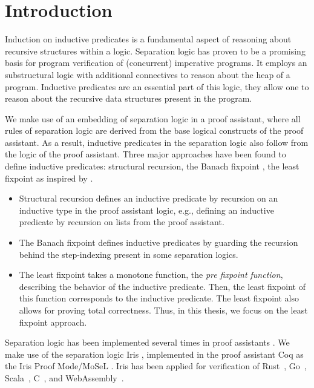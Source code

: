 \documentclass[thesis.tex]{subfiles}
\begin{document}
\chapter{Introduction}\label{ch:introduction}

Induction on inductive predicates is a fundamental aspect of reasoning about recursive structures within a logic. Separation logic \cite{ohearnLocalReasoningPrograms2001,reynoldsSeparationLogicLogic2002b} has proven to be a promising basis for program verification of (concurrent) imperative programs. It employs an substructural logic with additional connectives to reason about the heap of a program. Inductive predicates are an essential part of this logic, they allow one to reason about the recursive data structures present in the program.

We make use of an embedding of separation logic in a proof assistant, where all rules of separation logic are derived from the base logical constructs of the proof assistant. As a result, inductive predicates in the separation logic also follow from the logic of the proof assistant. Three major approaches have been found to define inductive predicates: structural recursion, the Banach fixpoint \cite{banachOperationsDansEnsembles1922}, the least fixpoint as inspired by  \cite{tarskiLatticetheoreticalFixpointTheorem1955}.
\begin{itemize}
  \item Structural recursion defines an inductive predicate by recursion on an inductive type in the proof assistant logic, e.g., defining an inductive predicate by recursion on lists from the proof assistant.
  \item The Banach fixpoint defines inductive predicates by guarding the recursion behind the step-indexing present in some separation logics.
  \item The least fixpoint takes a monotone function, the \emph{pre fixpoint function}, describing the behavior of the inductive predicate. Then, the least fixpoint of this function corresponds to the inductive predicate. The least fixpoint also allows for proving total correctness. Thus, in this thesis, we focus on the least fixpoint approach.
\end{itemize}

Separation logic has been implemented several times in proof assistants \cite{appelTacticsSeparationLogic2006,rouvoetIntrinsicallyTypedCompilation2021,chlipalaMostlyautomatedVerificationLowlevel2011,bengtsonCharge2012}. We make use of the separation logic Iris \cite*{jungIrisMonoidsInvariants2015a,jungHigherorderGhostState2016,krebbersEssenceHigherOrderConcurrent2017,jungIrisGroundModular2018}, implemented in the proof assistant Coq as the Iris Proof Mode/MoSeL \cite{krebbersInteractiveProofsHigherorder2017,krebbersMoSeLGeneralExtensible2018}. Iris has been applied for verification of Rust~\cite{jungRustBeltSecuringFoundations2017,dangRustBeltMeetsRelaxed2019,matsushitaRustHornBeltSemanticFoundation2022}, Go~\cite{chajedVerifyingConcurrentCrashsafe2019}, Scala~\cite{giarrussoScalaStepbystepSoundness2020}, C~\cite{sammlerRefinedCAutomatingFoundational2021}, and WebAssembly~\cite{raoIrisWasmRobustModular2023}.
\end{document}
